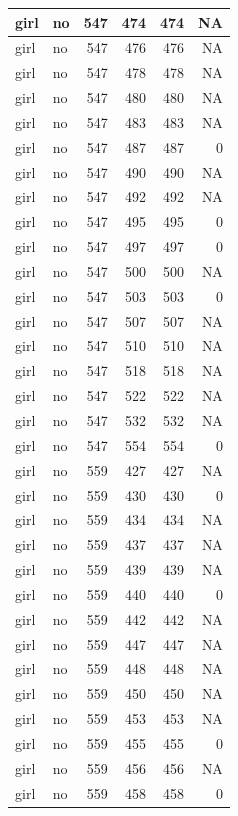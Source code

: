 \documentclass[man]{apa6}
\begin{document}
\begin{tabular}{l|l|r|r|r|r}
\hline
girl & no & 547 & 474 & 474 & NA\\
\hline
girl & no & 547 & 476 & 476 & NA\\
\hline
girl & no & 547 & 478 & 478 & NA\\
\hline
girl & no & 547 & 480 & 480 & NA\\
\hline
girl & no & 547 & 483 & 483 & NA\\
\hline
girl & no & 547 & 487 & 487 & 0\\
\hline
girl & no & 547 & 490 & 490 & NA\\
\hline
girl & no & 547 & 492 & 492 & NA\\
\hline
girl & no & 547 & 495 & 495 & 0\\
\hline
girl & no & 547 & 497 & 497 & 0\\
\hline
girl & no & 547 & 500 & 500 & NA\\
\hline
girl & no & 547 & 503 & 503 & 0\\
\hline
girl & no & 547 & 507 & 507 & NA\\
\hline
girl & no & 547 & 510 & 510 & NA\\
\hline
girl & no & 547 & 518 & 518 & NA\\
\hline
girl & no & 547 & 522 & 522 & NA\\
\hline
girl & no & 547 & 532 & 532 & NA\\
\hline
girl & no & 547 & 554 & 554 & 0\\
\hline
girl & no & 559 & 427 & 427 & NA\\
\hline
girl & no & 559 & 430 & 430 & 0\\
\hline
girl & no & 559 & 434 & 434 & NA\\
\hline
girl & no & 559 & 437 & 437 & NA\\
\hline
girl & no & 559 & 439 & 439 & NA\\
\hline
girl & no & 559 & 440 & 440 & 0\\
\hline
girl & no & 559 & 442 & 442 & NA\\
\hline
girl & no & 559 & 447 & 447 & NA\\
\hline
girl & no & 559 & 448 & 448 & NA\\
\hline
girl & no & 559 & 450 & 450 & NA\\
\hline
girl & no & 559 & 453 & 453 & NA\\
\hline
girl & no & 559 & 455 & 455 & 0\\
\hline
girl & no & 559 & 456 & 456 & NA\\
\hline
girl & no & 559 & 458 & 458 & 0\\

\end{tabular}
\end{document}
